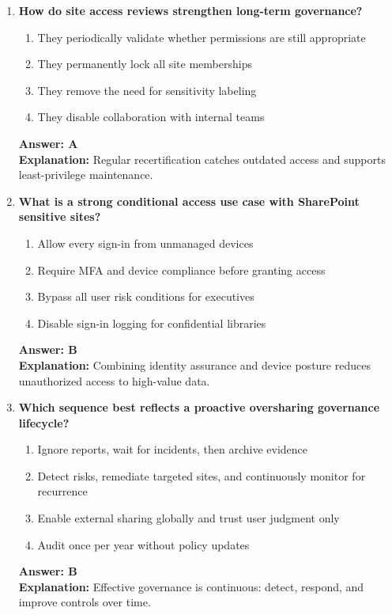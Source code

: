 \documentclass[10pt]{article}
\begin{document}
\begin{enumerate}[leftmargin=*]
\item \textbf{How do site access reviews strengthen long-term governance?}
\begin{enumerate}[label=\Alph*.]
  \item They periodically validate whether permissions are still appropriate
  \item They permanently lock all site memberships
  \item They remove the need for sensitivity labeling
  \item They disable collaboration with internal teams
\end{enumerate}
\textbf{Answer: A}\\
\textbf{Explanation:} Regular recertification catches outdated access and supports least-privilege maintenance.

\item \textbf{What is a strong conditional access use case with SharePoint sensitive sites?}
\begin{enumerate}[label=\Alph*.]
  \item Allow every sign-in from unmanaged devices
  \item Require MFA and device compliance before granting access
  \item Bypass all user risk conditions for executives
  \item Disable sign-in logging for confidential libraries
\end{enumerate}
\textbf{Answer: B}\\
\textbf{Explanation:} Combining identity assurance and device posture reduces unauthorized access to high-value data.

\item \textbf{Which sequence best reflects a proactive oversharing governance lifecycle?}
\begin{enumerate}[label=\Alph*.]
  \item Ignore reports, wait for incidents, then archive evidence
  \item Detect risks, remediate targeted sites, and continuously monitor for recurrence
  \item Enable external sharing globally and trust user judgment only
  \item Audit once per year without policy updates
\end{enumerate}
\textbf{Answer: B}\\
\textbf{Explanation:} Effective governance is continuous: detect, respond, and improve controls over time.

\end{enumerate}
\end{document}
